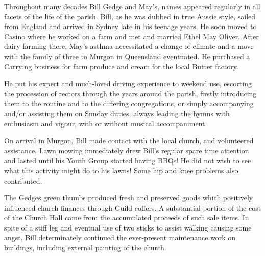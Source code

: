 Throughout many decades Bill Gedge and May's, names appeared regularly in all facets of the life of the parish. Bill, as he was dubbed in true Aussie style, sailed from England and arrived in Sydney late in his teenage years. He soon moved to Casino where he worked on a farm and met and married Ethel May Oliver. After dairy farming there, May's asthma necessitated a change of climate and a move with the family of three to Murgon in Queensland eventuated. He purchased a Carrying business for farm produce and cream for the local Butter factory.



He put his expert and much-loved driving experience to weekend use, escorting the procession of rectors through the years around the parish, firstly introducing them to the routine and to the differing congregations, or simply accompanying and/or assisting them on Sunday duties, always leading the hymns with enthusiasm and vigour, with or without musical accompaniment.



On arrival in Murgon, Bill made contact with the local church, and volunteered assistance. Lawn mowing immediately drew Bill's regular spare time attention and lasted until his Youth Group started having BBQs! He did not wish to see what this activity might do to his lawns! Some hip and knee problems also contributed.



The Gedges green thumbs produced fresh and preserved goods which positively influenced church finances through Guild coffers. A substantial portion of the cost of the Church Hall came from the accumulated proceeds of such sale items. In spite of a stiff leg and eventual use of two sticks to assist walking causing some angst, Bill determinately continued the ever-present maintenance work on buildings, including external painting of the church.









